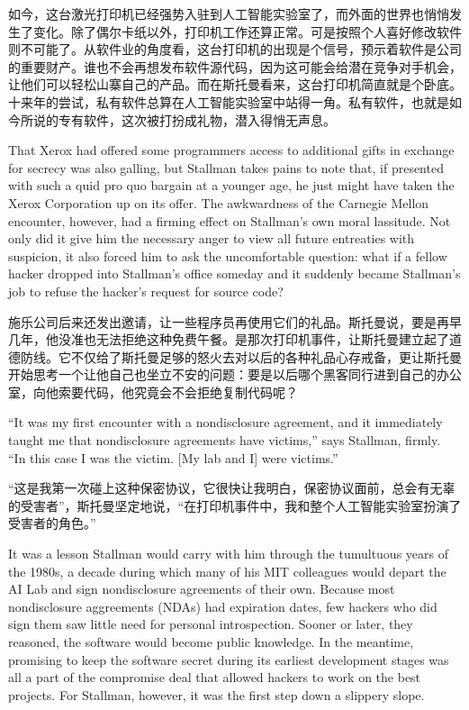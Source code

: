 \ifdefined\chs
如今，这台激光打印机已经强势入驻到人工智能实验室了，而外面的世界也悄悄发生了变化。除了偶尔卡纸以外，打印机工作还算正常。可是按照个人喜好修改软件则不可能了。从软件业的角度看，这台打印机的出现是个信号，预示着软件是公司的重要财产。谁也不会再想发布软件源代码，因为这可能会给潜在竞争对手机会，让他们可以轻松山寨自己的产品。而在斯托曼看来，这台打印机简直就是个卧底。十来年的尝试，私有软件总算在人工智能实验室中站得一角。私有软件，也就是如今所说的专有软件，这次被打扮成礼物，潜入得悄无声息。
\fi

\ifdefined\eng
That Xerox had offered some programmers access to additional gifts in exchange
for secrecy was also galling, but Stallman takes pains to note that, if
presented with such a quid pro quo bargain at a younger age, he just might have
taken the Xerox Corporation up on its offer. The awkwardness of the Carnegie
Mellon encounter, however, had a firming effect on Stallman's own moral
lassitude. Not only did it give him the necessary anger to view all future
entreaties with suspicion, it also forced him to ask the uncomfortable question:
what if a fellow hacker dropped into Stallman's office someday and it suddenly
became Stallman's job to refuse the hacker's request for source code?
\fi

\ifdefined\chs
施乐公司后来还发出邀请，让一些程序员再使用它们的礼品。斯托曼说，要是再早几年，他没准也无法拒绝这种免费午餐。是那次打印机事件，让斯托曼建立起了道德防线。它不仅给了斯托曼足够的怒火去对以后的各种礼品心存戒备，更让斯托曼开始思考一个让他自己也坐立不安的问题：要是以后哪个黑客同行进到自己的办公室，向他索要代码，他究竟会不会拒绝复制代码呢？ 
\fi
\fi

\ifdefined\eng
``It was my first encounter with a nondisclosure agreement, and it immediately
taught me that nondisclosure agreements have victims,'' says Stallman, firmly.
``In this case I was the victim. [My lab and I] were victims.'' 
\fi

\ifdefined\chs
``这是我第一次碰上这种保密协议，它很快让我明白，保密协议面前，总会有无辜的受害者''，斯托曼坚定地说，``在打印机事件中，我和整个人工智能实验室扮演了受害者的角色。''
\fi

\ifdefined\vone
\ifdefined\eng
It was a lesson Stallman would carry with him through the tumultuous years of the 1980s, a decade during which many of his MIT colleagues would depart the AI Lab and sign nondisclosure agreements of their own. Because most nondisclosure aggreements (NDAs) had expiration dates, few hackers who did sign them saw little need for personal introspection. Sooner or later, they reasoned, the software would become public knowledge. In the meantime, promising to keep the software secret during its earliest development stages was all a part of the compromise deal that allowed hackers to work on the best projects. For Stallman, however, it was the first step down a slippery slope.
\fi

